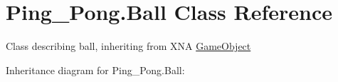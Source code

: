 \hypertarget{class_ping___pong_1_1_ball}{}\section{Ping\+\_\+\+Pong.\+Ball Class Reference}
\label{class_ping___pong_1_1_ball}


Class describing ball, inheriting from X\+NA \hyperlink{class_ping___pong_1_1_game_object}{Game\+Object}  




Inheritance diagram for Ping\+\_\+\+Pong.\+Ball\+:
